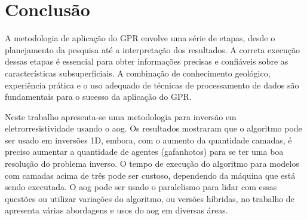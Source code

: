 

\chapter{Conclusão}
\label{cha:conclusao}

A metodologia de aplicação do GPR envolve uma série de etapas, desde o planejamento da pesquisa até a interpretação dos resultados. A correta execução dessas etapas é essencial para obter informações precisas e confiáveis sobre as características subsuperficiais. A combinação de conhecimento geológico, experiência prática e o uso adequado de técnicas de processamento de dados são fundamentais para o sucesso da aplicação do GPR.

Neste trabalho apresenta-se uma metodologia para inversão em eletrorresistividade usando o \ac{aog}. Os resultados mostraram que o algoritmo pode ser usado em inversões 1D, embora, com o aumento da quantidade camadas, é preciso aumentar a quantidade de agentes (gafanhotos) para se ter uma boa resolução do problema inverso. O tempo de execução do algoritmo para modelos com camadas acima de três pode ser custoso, dependendo da máquina que está sendo executada.  
O \ac{aog} pode ser usado o paralelismo para lidar com essas questões ou utilizar variações do algoritmo, ou versões híbridas, no trabalho de  apresenta várias abordagens e usos do \ac{aog} em diversas áreas.